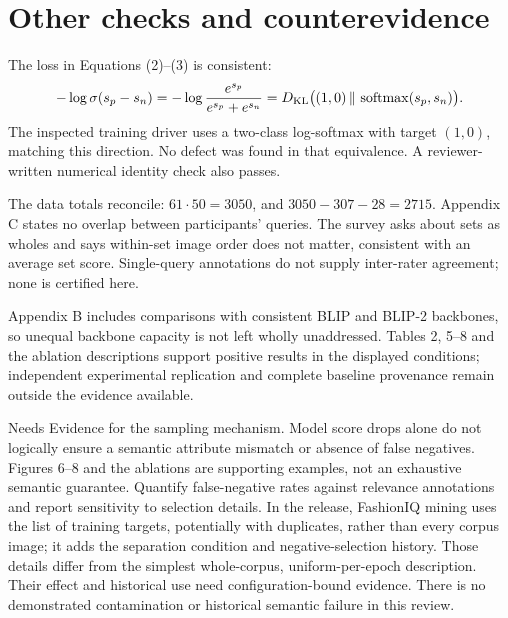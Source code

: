 \documentclass[10pt]{article}
\begin{document}
\section*{Other checks and counterevidence}
The loss in Equations (2)–(3) is consistent: \[-\log\sigma(s_p-s_n)
 =-\log\frac{e^{s_p}}{e^{s_p}+e^{s_n}}
 =D_{\rm KL}\bigl((1,0)\,\|\,\operatorname{softmax}(s_p,s_n)\bigr).\] The inspected training driver uses a two-class log-softmax with target \((1,0)\), matching this direction. No defect was found in that equivalence. A reviewer-written numerical identity check also passes.\par
The data totals reconcile: \(61\cdot50=3050\), and \(3050-307-28=2715\). Appendix C states no overlap between participants’ queries. The survey asks about sets as wholes and says within-set image order does not matter, consistent with an average set score. Single-query annotations do not supply inter-rater agreement; none is certified here.\par
Appendix B includes comparisons with consistent BLIP and BLIP-2 backbones, so unequal backbone capacity is not left wholly unaddressed. Tables 2, 5–8 and the ablation descriptions support positive results in the displayed conditions; independent experimental replication and complete baseline provenance remain outside the evidence available.\par
Needs Evidence for the sampling mechanism. Model score drops alone do not logically ensure a semantic attribute mismatch or absence of false negatives. Figures 6–8 and the ablations are supporting examples, not an exhaustive semantic guarantee. Quantify false-negative rates against relevance annotations and report sensitivity to selection details. In the release, FashionIQ mining uses the list of training targets, potentially with duplicates, rather than every corpus image; it adds the separation condition and negative-selection history. Those details differ from the simplest whole-corpus, uniform-per-epoch description. Their effect and historical use need configuration-bound evidence. There is no demonstrated contamination or historical semantic failure in this review.\par
\end{document}
